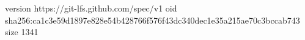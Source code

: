 version https://git-lfs.github.com/spec/v1
oid sha256:ca1c3e59d1897e828e54b428766f576f43dc340dec1e35a215ae70c3bccab743
size 1341
